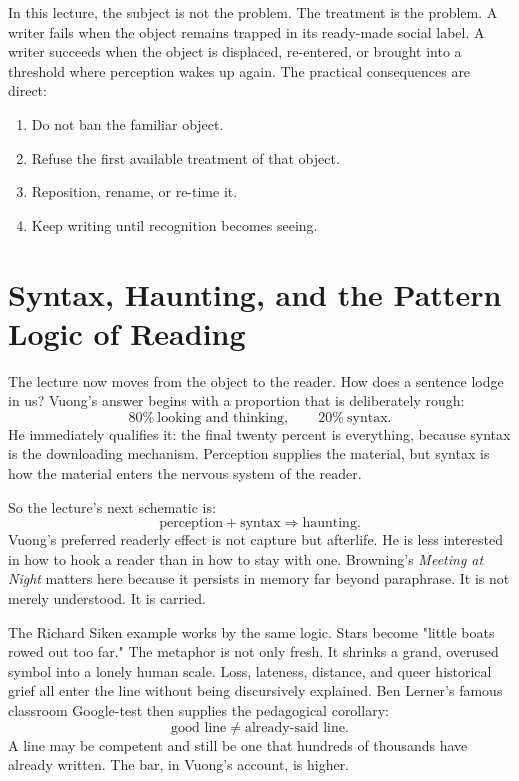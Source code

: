 In this lecture, the subject is not the problem. The treatment is the problem. A writer fails when the object remains trapped in its ready-made social label. A writer succeeds when the object is displaced, re-entered, or brought into a threshold where perception wakes up again. The practical consequences are direct:
\begin{enumerate}
\item Do not ban the familiar object.
\item Refuse the first available treatment of that object.
\item Reposition, rename, or re-time it.
\item Keep writing until recognition becomes seeing.
\end{enumerate}

\section{Syntax, Haunting, and the Pattern Logic of Reading}

The lecture now moves from the object to the reader. How does a sentence lodge in us? Vuong's answer begins with a proportion that is deliberately rough:
\begin{equation}
80\% \ \text{looking and thinking}, \qquad 20\% \ \text{syntax}.
\end{equation}
He immediately qualifies it: the final twenty percent is everything, because syntax is the downloading mechanism. Perception supplies the material, but syntax is how the material enters the nervous system of the reader.

So the lecture's next schematic is:
\begin{equation}
\text{perception} + \text{syntax} \Longrightarrow \text{haunting}.
\end{equation}
Vuong's preferred readerly effect is not capture but afterlife. He is less interested in how to hook a reader than in how to stay with one. Browning's \textit{Meeting at Night} matters here because it persists in memory far beyond paraphrase. It is not merely understood. It is carried.

The Richard Siken example works by the same logic. Stars become "little boats rowed out too far." The metaphor is not only fresh. It shrinks a grand, overused symbol into a lonely human scale. Loss, lateness, distance, and queer historical grief all enter the line without being discursively explained. Ben Lerner's famous classroom Google-test then supplies the pedagogical corollary:
\begin{equation}
\text{good line} \neq \text{already-said line}.
\end{equation}
A line may be competent and still be one that hundreds of thousands have already written. The bar, in Vuong's account, is higher.

